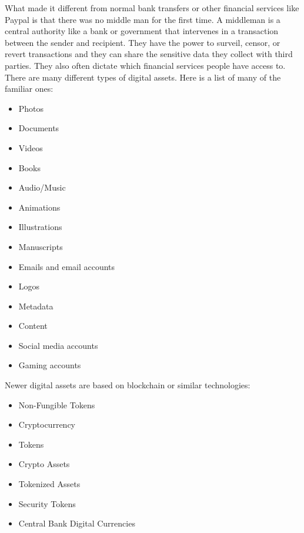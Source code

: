 \documentclass[MSE,Master,english]{twbook}%
\begin{document}
What made it different from normal bank transfers or other financial services like Paypal is that there was no middle man for the first time. A middleman is a central authority like a bank or government that intervenes in a transaction between the sender and recipient. They have the power to surveil, censor, or revert transactions and they can share the sensitive data they collect with third parties. They also often dictate which financial services people have access to.\cite{ethereum} \\

There are many different types of digital assets.\cite{digAssets} Here is a list of many of the familiar ones:
\begin{multicols}{2}
  \begin{itemize}
    \item Photos
    \item Documents
    \item Videos
    \item Books
    \item Audio/Music
    \item Animations
    \item Illustrations
    \item Manuscripts
    \item Emails and email accounts
    \item Logos
    \item Metadata
    \item Content
    \item Social media accounts
    \item Gaming accounts
  \end{itemize}
\end{multicols}

Newer digital assets are based on blockchain or similar technologies:
\begin{multicols}{2}
  \begin{itemize}
    \item Non-Fungible Tokens
    \item Cryptocurrency
    \item Tokens
    \item Crypto Assets
    \item Tokenized Assets
    \item Security Tokens
    \item Central Bank Digital Currencies
  \end{itemize}
\end{multicols}
\end{document}
